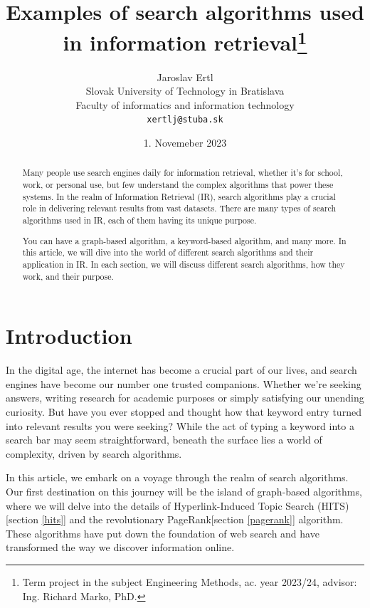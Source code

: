 \documentclass[10pt,english,a4paper]{article}
\title{Examples of search algorithms used in information retrieval\thanks{Term project in the subject Engineering Methods, ac. year 2023/24, advisor: Ing. Richard Marko, PhD.}}
\author{Jaroslav Ertl\\[2pt]
	{\small Slovak University of Technology in Bratislava}\\
	{\small Faculty of informatics and information technology}\\
	{\small \texttt{xertlj@stuba.sk}}
	}
\date{\small 1. Novemeber 2023}
\begin{document}
\maketitle
  
\begin{abstract}
    Many people use search engines daily for information retrieval, whether it's for school, work, or personal use, but few understand the complex algorithms that power these systems.  In the realm of Information Retrieval (IR), search algorithms play a crucial role in delivering relevant results from vast datasets. There are many types of search algorithms used in IR, each of them having its unique purpose. 

  You can have a graph-based algorithm, a keyword-based algorithm, and many more. In this article, we will dive into the world of different search algorithms and their application in IR. In each section, we will discuss different search algorithms, how they work, and their purpose.
\end{abstract}
\section{Introduction}
In the digital age, the internet has become a crucial part of our lives, and search engines have become our number one trusted companions. Whether we're seeking answers, writing research for academic purposes or simply satisfying our unending curiosity. But have you ever stopped and thought how that keyword entry turned into relevant results you were seeking? While the act of typing a keyword into a search bar may seem straightforward, beneath the surface lies a world of complexity, driven by search algorithms. 

In this article, we embark on a voyage through the realm of search algorithms. Our first destination on this journey will be the island of graph-based algorithms, where we will delve into the details of Hyperlink-Induced Topic Search (HITS)[section \ref{hits}] and the revolutionary PageRank[section \ref{pagerank}] algorithm. These algorithms have put down the foundation of web search and have transformed the way we discover information online. 
\end{document}
